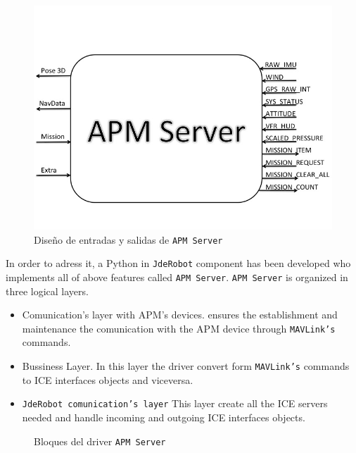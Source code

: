 \documentclass{llncs}
\begin{document}
\begin{figure}[h]
  \centering
  \includegraphics[scale=0.5]{img/diseno.jpg}
  \caption{Diseño de entradas y salidas de \texttt{APM Server}}
  \label{fig:diseno_apms_caja_negra}
\end{figure}

In order to adress it, a Python in \texttt{JdeRobot} component has been developed who implements all of above features called \texttt{APM Server}. 
\texttt{APM Server} is organized in three logical layers.
\begin{itemize}
\item Comunication's layer with APM's devices. ensures the establishment and maintenance the comunication with the APM device through \texttt{MAVLink's} commands.
\item Bussiness Layer. In this layer the driver convert form \texttt{MAVLink's} commands to ICE interfaces objects and viceversa.
\item \texttt{JdeRobot comunication's layer} This layer create all the ICE servers needed and handle incoming and outgoing ICE interfaces objects.
\end{itemize}
\begin{figure}[h]
    \caption{Bloques del driver \texttt{APM Server}}
  
\end{figure}
\end{document}

